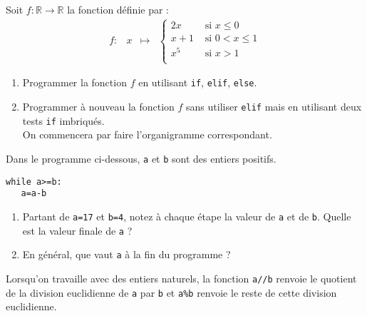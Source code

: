 \begin{exercice}
Soit $f\colon\mathbb{R}\to \mathbb{R}$ la fonction définie par :
\[\begin{array}{ccccc}
f\colon  & x & \longmapsto & \left\lbrace\begin{array}{ll}
      2x & \text{ si } x\leq 0\\
      x+1 & \text{ si } 0<x\leq 1\\
      x^5 & \text{ si } x>1\\
      \end{array}\right.
\end{array}\]
\begin{enumerate}
\item Programmer la fonction $f$ en utilisant \verb?if?, \verb?elif?, \verb?else?.
\item Programmer à nouveau la fonction $f$ sans utiliser \verb?elif? mais en utilisant deux tests \verb?if? imbriqués. \\
On commencera par faire l'organigramme correspondant. 
\end{enumerate}
\end{exercice}
\bigskip


\begin{exercice}
Dans le programme ci-dessous, \verb?a? et \verb?b? sont des entiers positifs.
\begin{verbatim}
while a>=b:
   a=a-b
\end{verbatim}
\begin{enumerate}
\item Partant de \verb?a=17? et \verb?b=4?, notez à chaque étape la valeur de \verb?a? et de \verb?b?. Quelle est la valeur finale de \verb?a? ?
\item En général, que vaut \verb?a? à la fin du programme ?
\end{enumerate} 
\end{exercice}
\bigskip


\begin{remark}
Lorsqu'on travaille avec des entiers naturels, la fonction \verb?a//b? renvoie le quotient de la division euclidienne de \verb?a? par \verb?b? et \verb?a%b? renvoie le reste de cette division euclidienne.
\end{remark}
\bigskip



